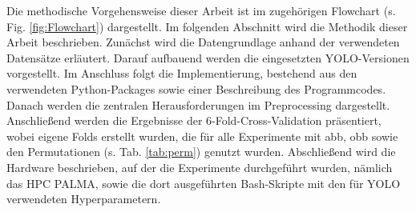 

Die methodische Vorgehensweise dieser Arbeit ist im zugehörigen Flowchart (s. Fig. \ref{fig:Flowchart}) dargestellt. Im folgenden Abschnitt wird die Methodik dieser Arbeit beschrieben. Zunächst wird die Datengrundlage anhand der verwendeten Datensätze erläutert. Darauf aufbauend werden die eingesetzten \acrshort{YOLO}-Versionen vorgestellt. Im Anschluss folgt die Implementierung, bestehend aus den verwendeten Python-Packages sowie einer Beschreibung des Programmcodes. Danach werden die zentralen Herausforderungen im Preprocessing dargestellt. Anschließend werden die Ergebnisse der 6-Fold-Cross-Validation präsentiert, wobei eigene Folds erstellt wurden, die für alle Experimente mit \acrshort{abb}, \acrshort{obb} sowie den Permutationen (s. Tab. \ref{tab:perm}) genutzt wurden. Abschließend wird die Hardware beschrieben, auf der die Experimente durchgeführt wurden, nämlich das \acrlong{HPC} \acrshort{PALMA}, sowie die dort ausgeführten Bash-Skripte mit den für \acrshort{YOLO} verwendeten Hyperparametern.  


